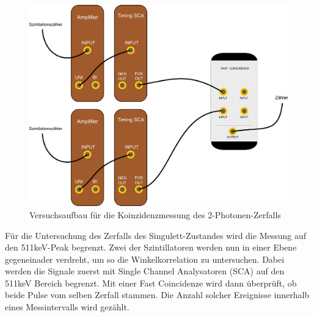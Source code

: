 \begin{figure}[H]
 \includegraphics[width=\textwidth]{BilderAufbau/2er-koinzidenz.pdf}
 \caption{Versuchsaufbau für die Koinzidenzmessung des 2-Photonen-Zerfalls}
 \label{schaltplan_2_sca_coin_zaehler}
\end{figure}

Für die Untersuchung des Zerfalls des Singulett-Zustandes wird die Messung auf den 511keV-Peak begrenzt. Zwei der Szintillatoren werden nun in einer Ebene gegeneinader verdreht, um so die Winkelkorrelation zu untersuchen. Dabei werden die Signale zuerst mit Single Channel Analysatoren (SCA) auf den 511keV Bereich begrenzt. Mit einer Fast Coincidenze wird dann überprüft, ob beide Pulse vom selben Zerfall stammen. Die Anzahl solcher Ereignisse innerhalb eines Messintervalls wird gezählt. 


